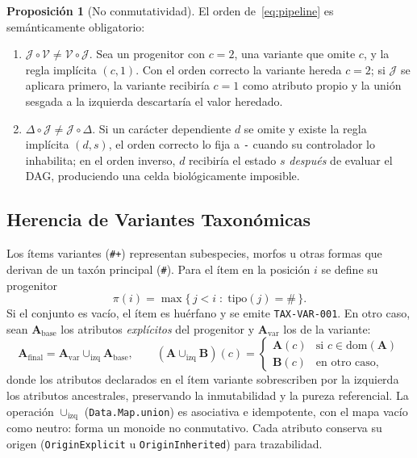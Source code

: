 \documentclass[11pt,a4paper]{article}
\theoremstyle{definition}
\newtheorem{proposicion}{Proposición}[section]
\theoremstyle{remark}
\begin{document}
\begin{proposicion}[No conmutatividad]
El orden de~\eqref{eq:pipeline} es semánticamente obligatorio:
\begin{enumerate}
    \item $\mathcal{J} \circ \mathcal{V} \neq \mathcal{V} \circ \mathcal{J}$. Sea un progenitor con $c = 2$, una variante que omite $c$, y la regla implícita $(c, 1)$. Con el orden correcto la variante hereda $c=2$; si $\mathcal{J}$ se aplicara primero, la variante recibiría $c=1$ como atributo propio y la unión sesgada a la izquierda descartaría el valor heredado.
    \item $\Delta \circ \mathcal{J} \neq \mathcal{J} \circ \Delta$. Si un carácter dependiente $d$ se omite y existe la regla implícita $(d, s)$, el orden correcto lo fija a \texttt{-} cuando su controlador lo inhabilita; en el orden inverso, $d$ recibiría el estado $s$ \emph{después} de evaluar el DAG, produciendo una celda biológicamente imposible.
\end{enumerate}
\end{proposicion}

\subsection{Herencia de Variantes Taxonómicas}
\label{sec:variantes}
Los ítems variantes (\texttt{\#+}) representan subespecies, morfos u otras formas que derivan de un taxón principal (\texttt{\#}). Para el ítem en la posición $i$ se define su progenitor
\begin{equation}
\pi(i) = \max\{\, j < i \;:\; \mathrm{tipo}(j) = \texttt{\#} \,\}.
\end{equation}
Si el conjunto es vacío, el ítem es huérfano y se emite \texttt{TAX-VAR-001}. En otro caso, sean $\mathbf{A}_{\text{base}}$ los atributos \emph{explícitos} del progenitor y $\mathbf{A}_{\text{var}}$ los de la variante:
\begin{equation}
\label{eq:variantes}
\mathbf{A}_{\text{final}} = \mathbf{A}_{\text{var}} \mathbin{\cup_{\text{izq}}} \mathbf{A}_{\text{base}},
\qquad
(\mathbf{A} \mathbin{\cup_{\text{izq}}} \mathbf{B})(c) = \begin{cases} \mathbf{A}(c) & \text{si } c \in \mathrm{dom}(\mathbf{A}) \\ \mathbf{B}(c) & \text{en otro caso,} \end{cases}
\end{equation}
donde los atributos declarados en el ítem variante sobrescriben por la izquierda los atributos ancestrales, preservando la inmutabilidad y la pureza referencial. La operación $\cup_{\text{izq}}$ (\texttt{Data.Map.union}) es asociativa e idempotente, con el mapa vacío como neutro: forma un monoide no conmutativo. Cada atributo conserva su origen (\texttt{OriginExplicit} u \texttt{OriginInherited}) para trazabilidad.
\end{document}
